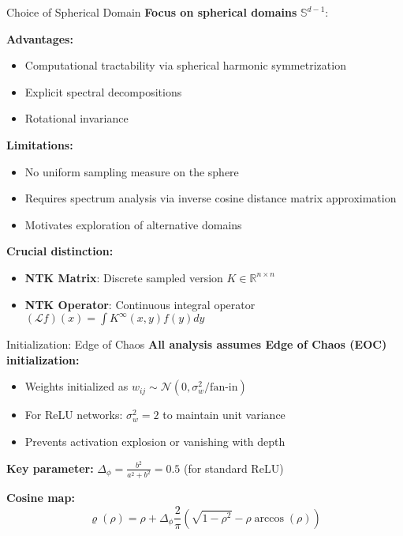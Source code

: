 \documentclass{beamer}
\begin{document}
\begin{frame}{Choice of Spherical Domain}
\textbf{Focus on spherical domains} $\mathbb{S}^{d-1}$:

\textbf{Advantages:}
\begin{itemize}
\item Computational tractability via spherical harmonic symmetrization
\item Explicit spectral decompositions
\item Rotational invariance
\end{itemize}

\textbf{Limitations:}
\begin{itemize}
\item No uniform sampling measure on the sphere
\item Requires spectrum analysis via inverse cosine distance matrix approximation
\item Motivates exploration of alternative domains
\end{itemize}

\textbf{Crucial distinction:}
\begin{itemize}
\item \textbf{NTK Matrix}: Discrete sampled version $K \in \mathbb{R}^{n \times n}$
\item \textbf{NTK Operator}: Continuous integral operator $(\mathcal{L}f)(x) = \int K^{\infty}(x,y)f(y)dy$
\end{itemize}
\end{frame}

\begin{frame}{Initialization: Edge of Chaos}
\textbf{All analysis assumes Edge of Chaos (EOC) initialization:}

\begin{itemize}
\item Weights initialized as $w_{ij} \sim \mathcal{N}(0, \sigma_w^2/\text{fan-in})$
\item For ReLU networks: $\sigma_w^2 = 2$ to maintain unit variance
\item Prevents activation explosion or vanishing with depth
\end{itemize}

\textbf{Key parameter:} $\Delta_\phi = \frac{b^2}{a^2+b^2} = 0.5$ (for standard ReLU)

\textbf{Cosine map:}
\[ \varrho(\rho) = \rho + \Delta_\phi \frac{2}{\pi}\left( \sqrt{1-\rho^2} - \rho \arccos(\rho) \right) \]
\end{frame}
\end{document}

